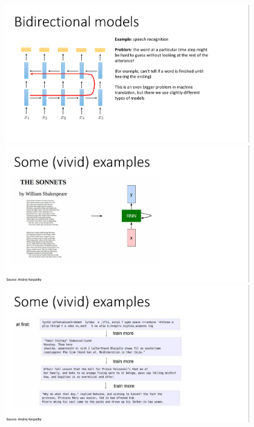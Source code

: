 \documentclass{book}
\begin{document}
\begin{figure}[H]
    \centering
    \includegraphics[width=0.95\textwidth]{images/lec10_25.png}
    \includegraphics[width=0.95\textwidth]{images/lec10_26.png}
    \includegraphics[width=0.95\textwidth]{images/lec10_27.png}
\end{figure}
\end{document}
